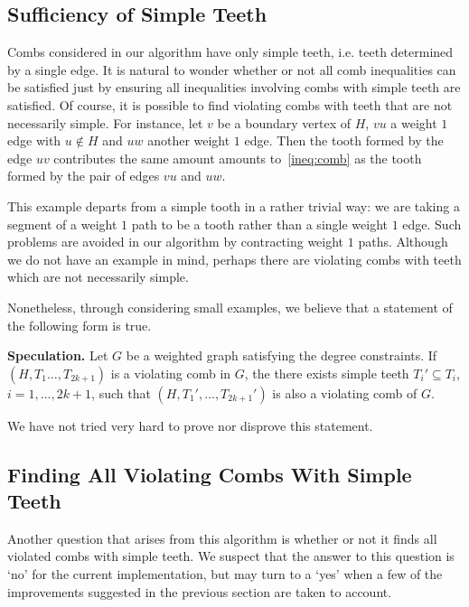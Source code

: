 \documentclass[11pt, letterpaper]{amsart}
\theoremstyle{plain}
\theoremstyle{definition}
\theoremstyle{remark}
\begin{document}
\subsection{Sufficiency of Simple Teeth}
Combs considered in our algorithm have only simple teeth, i.e. teeth determined
by a single edge. It is natural to wonder whether or not all comb inequalities
can be satisfied just by ensuring all inequalities involving combs with simple
teeth are satisfied. Of course, it is possible to find violating combs with
teeth that are not necessarily simple. For instance, let $v$ be a boundary
vertex of $H$, $vu$ a weight $1$ edge with $u \notin H$ and $uw$ another weight
$1$ edge. Then the tooth formed by the edge $uv$ contributes the same amount
amounts to~\eqref{ineq:comb} as the tooth formed by the pair of edges $vu$ and
$uw$.

This example departs from a simple tooth in a rather trivial way: we are taking
a segment of a weight $1$ path to be a tooth rather than a single weight $1$
edge. Such problems are avoided in our algorithm by contracting weight $1$
paths. Although we do not have an example in mind, perhaps there are violating
combs with teeth which are not necessarily simple.

Nonetheless, through considering small examples, we believe that a statement of
the following form is true.

\noindent\textbf{Speculation.} Let $G$ be a weighted graph satisfying
the degree constraints. If $(H,T_1\ldots,T_{2k+1})$ is a violating comb in $G$,
the there exists simple teeth $T_i' \subseteq T_i$, $i = 1,\ldots,2k+1$, such
that $(H,T_1',\ldots,T_{2k+1}')$ is also a violating comb of $G$.

We have not tried very hard to prove nor disprove this statement.

\subsection{Finding All Violating Combs With Simple Teeth}
Another question that arises from this algorithm is whether or not it finds all
violated combs with simple teeth. We suspect that the answer to this question
is `no' for the current implementation, but may turn to a `yes' when a few of
the improvements suggested in the previous section are taken to account.
\end{document}

